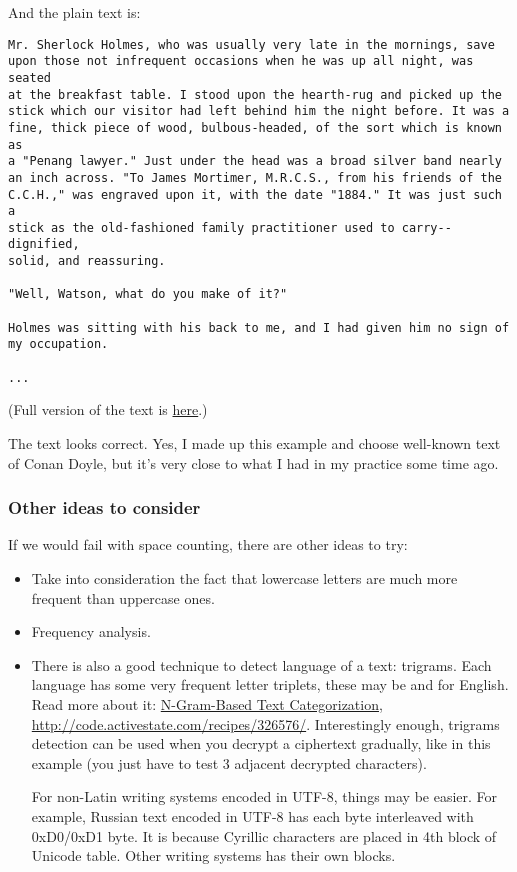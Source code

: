 And the plain text is:

\begin{lstlisting}
Mr. Sherlock Holmes, who was usually very late in the mornings, save
upon those not infrequent occasions when he was up all night, was seated
at the breakfast table. I stood upon the hearth-rug and picked up the
stick which our visitor had left behind him the night before. It was a
fine, thick piece of wood, bulbous-headed, of the sort which is known as
a "Penang lawyer." Just under the head was a broad silver band nearly
an inch across. "To James Mortimer, M.R.C.S., from his friends of the
C.C.H.," was engraved upon it, with the date "1884." It was just such a
stick as the old-fashioned family practitioner used to carry--dignified,
solid, and reassuring.

"Well, Watson, what do you make of it?"

Holmes was sitting with his back to me, and I had given him no sign of
my occupation.

...
\end{lstlisting}

(Full version of the text is \href{https://github.com/DennisYurichev/RE-for-beginners/blob/master/ff/XOR/mask_2/files/plain.txt}{here}.)

The text looks correct.
Yes, I made up this example and choose well-known text of Conan Doyle, but it's very close to what I had in my practice some time ago.

\subsubsection{Other ideas to consider}

If we would fail with space counting, there are other ideas to try:

\begin{itemize}

\item Take into consideration the fact that lowercase letters are much more frequent than uppercase ones.

\item Frequency analysis.

\item There is also a good technique to detect language of a text: trigrams.
Each language has some very frequent letter triplets, these may be  and  for English.
Read more about it:
\href{http://odur.let.rug.nl/~vannoord/TextCat/textcat.pdf}{N-Gram-Based Text Categorization},
\url{http://code.activestate.com/recipes/326576/}.
Interestingly enough, trigrams detection can be used when you decrypt a ciphertext gradually,
like in this example (you just have to test 3 adjacent decrypted characters).

For non-Latin writing systems encoded in UTF-8, things may be easier.
For example, Russian text encoded in UTF-8 has each byte interleaved with 0xD0/0xD1 byte.
It is because Cyrillic characters are placed in 4th block of Unicode table.
Other writing systems has their own blocks.

\end{itemize}

